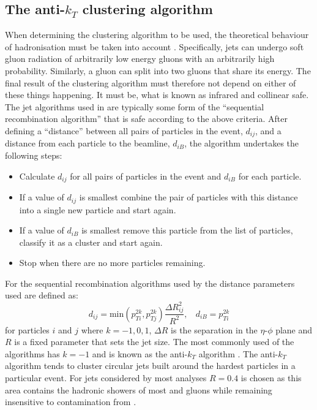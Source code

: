 \subsection{The anti-$k_T$ clustering algorithm}

When determining the clustering algorithm to be used, the theoretical
behaviour of hadronisation must be taken into account
\cite{Salam2010}. Specifically, jets can undergo soft gluon radiation
of arbitrarily low energy gluons with an arbitrarily high probability.
Similarly, a gluon can split into two gluons that share its energy.
The final result of the clustering algorithm must therefore not depend
on either of these things happening. It must be, what is known as
infrared and collinear safe. The jet algorithms used in \CMS are
typically some form of the ``sequential recombination algorithm'' that
is safe according to the above criteria. After defining a ``distance''
between all pairs of particles in the event, $d_{ij}$, and a distance
from each particle to the beamline, $d_{iB}$, the algorithm undertakes
the following steps:
\begin{itemize}
\item{Calculate $d_{ij}$ for all pairs of particles in the event and
$d_{iB}$ for each particle.}
\item{If a value of $d_{ij}$ is smallest combine the pair of particles
with this distance into a single new particle and start again.}
\item{If a value of $d_{iB}$ is smallest remove this particle from the
list of particles, classify it as a cluster and start again.}
\item{Stop when there are no more particles remaining.}
\end{itemize}
For the sequential recombination algorithms used by \CMS the distance
parameters used are defined as:
\begin{equation} \label{eq:antiktdij}
d_{ij} = \textrm{min}(p_{Ti}^{2k},p_{Tj}^{2k})\frac{\Delta R_{ij}^2}{R^2} ,~~~~d_{iB} = p_{Ti}^{2k}
\end{equation} 
for particles $i$ and $j$ where $k=-1,0,1$, $\Delta R$
is the separation in the $\eta$-$\phi$ plane and $R$ is a fixed
parameter that sets the jet size. The most commonly used of the \CMS
algorithms has $k=-1$ and is known as the anti-$k_T$ algorithm
\cite{1126-6708-2008-04-063}. The anti-$k_T$ algorithm tends to
cluster circular jets built around the hardest particles in a
particular event. For jets considered by most analyses $R=0.4$ is
chosen as this area contains the hadronic showers of most and gluons
while remaining insensitive to contamination from \PU.

